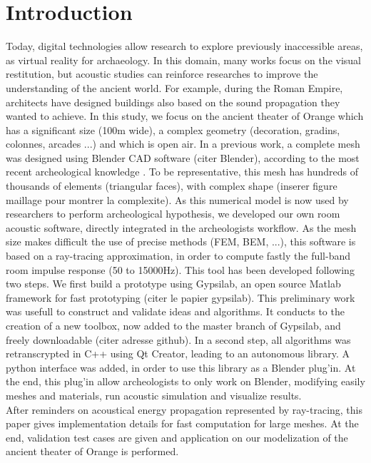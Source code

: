 \documentclass[AMA,STIX1COL]{WileyNJD-v2}
\begin{document}
\section*{Introduction}
\label{sec1}
Today, digital technologies allow research to explore previously inaccessible areas, as virtual reality for archaeology. In this domain, many works focus on the visual restitution, but acoustic studies can reinforce researches to improve the understanding of the ancient world. For example, during the Roman Empire, architects have designed buildings also based on the sound propagation they wanted to achieve\cite{vitruve}. In this study, we focus on the ancient theater of Orange which has a significant size (100m wide), a complex geometry (decoration, gradins, colonnes, arcades ...) and which is open air. In a previous work, a complete mesh was designed using Blender CAD software (citer Blender), according to the most recent archeological knowledge \cite{theseRobin}. To be representative, this mesh has hundreds of thousands of elements (triangular faces), with complex shape (inserer figure maillage pour montrer la complexite). As this numerical model is now used by researchers to perform archeological hypothesis, we developed our own room acoustic software, directly integrated in the archeologists workflow. As the mesh size makes difficult the use of precise methods (FEM, BEM, ...), this software is based on a ray-tracing approximation, in order to compute fastly the full-band room impulse response (50 to 15000Hz). This tool has been developed following two steps. We first build a prototype using Gypsilab, an open source Matlab framework for fast prototyping (citer le papier gypsilab). This preliminary work was usefull to construct and validate ideas and algorithms. It conducts to the creation of a new toolbox, now added to the master branch of Gypsilab, and freely downloadable (citer adresse github). In a second step, all algorithms was retranscrypted in C++ using Qt Creator, leading to an autonomous library. A python interface was added, in order to use this library as a Blender plug'in. At the end, this plug'in allow archeologists to only work on Blender, modifying easily meshes and materials, run acoustic simulation and visualize results. \\
After reminders on acoustical energy propagation represented by ray-tracing, this paper gives implementation details for fast computation for large meshes. At the end, validation test cases are given and application on our modelization of the ancient theater of Orange is performed. 
\end{document}
